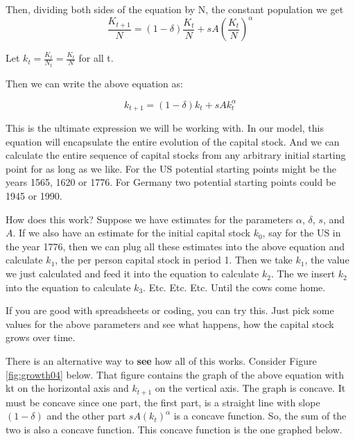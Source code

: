 \documentclass[
]{book}
\begin{document}
Then, dividing both sides of the equation by N, the constant population we get
\[\frac{K_{t+1}}{N}=(1-\delta)\frac{K_t}{N}+sA(\frac{K_t}{N})^\alpha\]

Let \(k_t=\frac{K_t}{N_t} = \frac{K_t}{N}\) for all t.

Then we can write the above equation as:

\[k_{t+1}=(1-\delta) k_t+s A k_t^α\]

This is the ultimate expression we will be working with. In our model, this equation will encapsulate the entire evolution of the capital stock. And we can calculate the entire sequence of capital stocks from any arbitrary initial starting point for as long as we like. For the US potential starting points might be the years 1565, 1620 or 1776. For Germany two potential starting points could be 1945 or 1990.

How does this work? Suppose we have estimates for the parameters \(\alpha\), \(\delta\), \(s\), and \(A\). If we also have an estimate for the initial capital stock \(k_0\), say for the US in the year 1776, then we can plug all these estimates into the above equation and calculate \(k_1\), the per person capital stock in period 1. Then we take \(k_1\), the value we just calculated and feed it into the equation to calculate \(k_2\). The we insert \(k_2\) into the equation to calculate \(k_3\).
Etc.
Etc.
Etc.
Until the cows come home.

If you are good with spreadsheets or coding, you can try this. Just pick some values for the above parameters and see what happens, how the capital stock grows over time.

There is an alternative way to \textbf{see} how all of this works. Consider Figure \ref{fig:growth04} below. That figure contains the graph of the above equation with kt on the horizontal axis and \(k_{t+1}\) on the vertical axis.
The graph is concave. It must be concave since one part, the first part, is a straight line with slope \((1 - \delta)\) and the other part \(sA(k_t)^\alpha\) is a concave function. So, the sum of the two is also a concave function. This concave function is the one graphed below.
\end{document}
